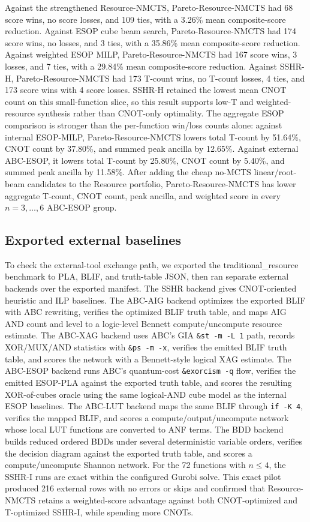 \documentclass[11pt]{article}
\newcommand{\method}{Resource-NMCTS}
\newcommand{\paretomethod}{Pareto-Resource-NMCTS}
\newcommand{\traditionaldataset}{traditional\_resource}
\begin{document}
Against the strengthened \method{}, \paretomethod{} had 68 score wins, no score losses, and 109
ties, with a 3.26\% mean composite-score reduction.  Against ESOP cube beam
search, \paretomethod{} had 174 score wins, no losses, and 3 ties, with a
35.86\% mean composite-score reduction.  Against weighted ESOP MILP,
\paretomethod{} had 167 score wins, 3 losses, and 7 ties, with a 29.84\% mean
composite-score reduction.  Against SSHR-H, \paretomethod{} had 173 T-count
wins, no T-count losses, 4 ties, and 173 score wins with 4 score losses.
SSHR-H retained the lowest mean CNOT count on this small-function slice, so
this result supports low-T and weighted-resource synthesis rather than
CNOT-only optimality.
The aggregate ESOP comparison is stronger than the per-function win/loss
counts alone: against internal ESOP-MILP, \paretomethod{} lowers total T-count
by 51.64\%, CNOT count by 37.80\%, and summed peak ancilla by 12.65\%.  Against
external ABC-ESOP, it lowers total T-count by 25.80\%, CNOT count by 5.40\%,
and summed peak ancilla by 11.58\%.  After adding the cheap no-MCTS
linear/root-beam candidates to the Resource portfolio, \paretomethod{} has
lower aggregate T-count, CNOT count, peak ancilla, and weighted score in every
$n=3,\ldots,6$ ABC-ESOP group.

\subsection{Exported external baselines}

To check the external-tool exchange path, we exported the
\traditionaldataset{} benchmark to PLA, BLIF, and truth-table JSON, then ran
separate external backends over the exported manifest.  The SSHR backend gives
CNOT-oriented heuristic and ILP baselines.  The ABC-AIG backend optimizes the
exported BLIF with ABC rewriting, verifies the optimized BLIF truth table, and
maps AIG AND count and level to a logic-level Bennett compute/uncompute
resource estimate.  The ABC-XAG backend uses ABC's GIA \texttt{\&st -m -L 1}
path, records XOR/MUX/AND statistics with \texttt{\&ps -m -x}, verifies the
emitted BLIF truth table, and scores the network with a Bennett-style logical
XAG estimate.  The ABC-ESOP backend runs ABC's quantum-cost
\texttt{\&exorcism -q} flow, verifies the emitted ESOP-PLA against the exported
truth table, and scores the resulting XOR-of-cubes oracle using the same
logical-AND cube model as the internal ESOP baselines.  The ABC-LUT backend maps
the same BLIF through \texttt{if -K 4}, verifies the mapped BLIF, and scores a
compute/output/uncompute network whose local LUT functions are converted to
ANF terms.  The BDD backend builds reduced ordered BDDs under several
deterministic variable orders, verifies the decision diagram against the
exported truth table, and scores a
compute/uncompute Shannon network.  For the 72 functions
with $n\leq 4$, the SSHR-I runs are
exact within the configured Gurobi solve.  This exact pilot produced 216
external rows with no errors or skips and confirmed that \method{} retains a
weighted-score advantage against both CNOT-optimized and T-optimized SSHR-I,
while spending more CNOTs.
\end{document}

